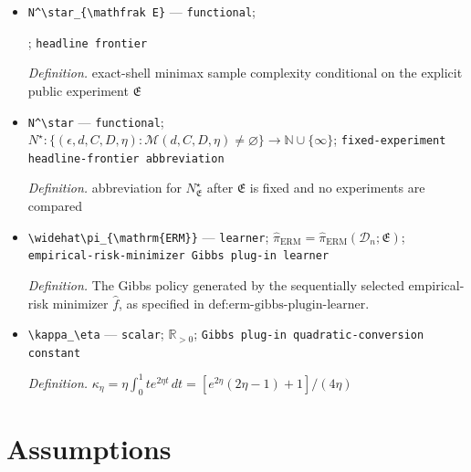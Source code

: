 \documentclass{article}
\begin{document}
\begin{itemize}
  \item \texttt{N\textasciicircum{}\textbackslash{}\allowbreak{}star\_\allowbreak{}\{\textbackslash{}\allowbreak{}mathfrak E\}\allowbreak{}} --- \texttt{functional}; \par\noindent {}\par\noindent; \texttt{headline frontier}
  \par\smallskip\noindent\emph{Definition.} exact-shell minimax sample complexity conditional on the explicit public experiment \(\mathfrak E\)
  \item \texttt{N\textasciicircum{}\textbackslash{}\allowbreak{}star} --- \texttt{functional}; \(N^\star:\{(\epsilon,d,C,D,\eta):\mathcal M(d,C,D,\eta)\ne\varnothing\}\to\mathbb N\cup\{\infty\}\); \texttt{fixed-\allowbreak{}experiment headline-\allowbreak{}frontier abbreviation}
  \par\smallskip\noindent\emph{Definition.} abbreviation for \(N^\star_{\mathfrak E}\) after \(\mathfrak E\) is fixed and no experiments are compared
  \item \texttt{\textbackslash{}\allowbreak{}widehat\textbackslash{}\allowbreak{}pi\_\allowbreak{}\{\textbackslash{}\allowbreak{}mathrm\{ERM\}\allowbreak{}\}\allowbreak{}} --- \texttt{learner}; \(\widehat\pi_{\mathrm{ERM}}=\widehat\pi_{\mathrm{ERM}}(\mathcal D_n;\mathfrak E)\); \texttt{empirical-\allowbreak{}risk-\allowbreak{}minimizer Gibbs plug-\allowbreak{}in learner}
  \par\smallskip\noindent\emph{Definition.} The Gibbs policy generated by the sequentially selected empirical-risk minimizer \(\widehat f\), as specified in \(\text{def:erm-gibbs-plugin-learner}\).
  \item \texttt{\textbackslash{}\allowbreak{}kappa\_\allowbreak{}\textbackslash{}\allowbreak{}eta} --- \texttt{scalar}; \(\mathbb R_{>0}\); \texttt{Gibbs plug-\allowbreak{}in quadratic-\allowbreak{}conversion constant}
  \par\smallskip\noindent\emph{Definition.} \(\kappa_\eta=\eta\int_0^1t e^{2\eta t}\,dt=[e^{2\eta}(2\eta-1)+1]/(4\eta)\)
\end{itemize}

\section{Assumptions}
\end{document}
